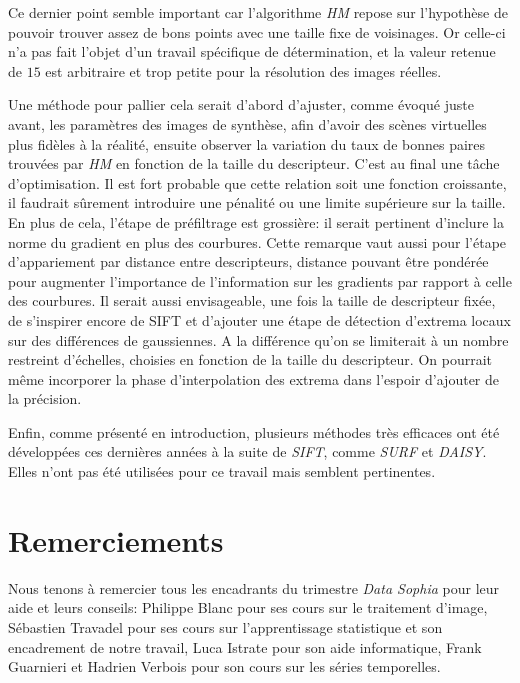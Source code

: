 \documentclass[
	a4paper, %
	10pt, %
	unnumberedsections, %
	twoside, %
]{LTJournalArticle}
\begin{document}
Ce dernier point semble important car l'algorithme \textit{HM} repose sur l'hypothèse
de pouvoir trouver assez de bons points avec une taille fixe de voisinages. Or celle-ci
n'a pas fait l'objet d'un travail spécifique de détermination, et la valeur retenue de $15$
est arbitraire et trop petite pour la résolution des images réelles.

Une méthode pour pallier cela serait d'abord d'ajuster, comme évoqué juste avant, les paramètres des
images de synthèse, afin d'avoir des scènes virtuelles plus fidèles à la réalité, ensuite
observer la variation du taux de bonnes paires trouvées par \textit{HM} en fonction de la taille du descripteur. C'est au final une tâche d'optimisation.
Il est fort probable que cette relation soit une fonction croissante,
il faudrait sûrement introduire une pénalité ou une limite
supérieure sur la taille.
En plus de cela, l'étape de préfiltrage est grossière: il serait pertinent d'inclure
la norme du gradient en plus des courbures. Cette remarque vaut aussi pour l'étape
d'appariement par distance entre descripteurs, distance pouvant être
pondérée pour augmenter l'importance de l'information sur les gradients par rapport
à celle des courbures.
Il serait aussi envisageable, une fois la taille de descripteur fixée, de s'inspirer
encore de SIFT et d'ajouter une étape de détection d'extrema
locaux sur des différences de gaussiennes. A la différence qu'on se limiterait à
un nombre restreint d'échelles, choisies en fonction de la taille du descripteur.
On pourrait même incorporer la phase d'interpolation des extrema dans l'espoir
d'ajouter de la précision.

Enfin, comme présenté en introduction, plusieurs méthodes très efficaces ont été développées
ces dernières années à la suite de \textit{SIFT}, comme \textit{SURF} et \textit{DAISY}.
Elles n'ont pas été utilisées pour ce travail mais semblent pertinentes.

\section{Remerciements}

Nous tenons à remercier tous les encadrants du trimestre \textit{Data Sophia}
pour leur aide et leurs conseils: Philippe Blanc pour ses cours sur le traitement d'image,
Sébastien Travadel pour ses cours sur l'apprentissage statistique et son encadrement de notre travail,
Luca Istrate pour son aide informatique, Frank Guarnieri et Hadrien Verbois pour son cours sur
les séries temporelles.
\end{document}
